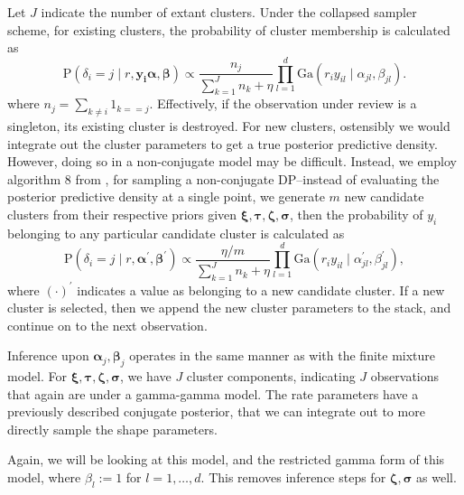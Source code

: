   Let $J$ indicate the number of extant clusters.  Under the collapsed sampler scheme, for existing
  clusters, the probability of cluster membership is calculated as
  \begin{equation}
    \label{eqn:dpdelta}
    \text{P}\left(\delta_i = j\mid r, \bm{ y_i} \bm{ \alpha}, \bm{ \beta}\right) \propto
        \frac{n_j}{\sum_{k = 1}^{J} n_k + \eta}
        {\textstyle\prod}_{l = 1}^d\text{Ga}\left(r_iy_{il}\mid\alpha_{jl},\beta_{jl}\right).
  \end{equation}
  where $n_j = {\textstyle\sum}_{k\neq i}1_{k == j}$.  Effectively, if the observation under review is a
  singleton, its existing cluster is destroyed.  For new clusters, ostensibly we would integrate out
  the cluster parameters to get a true posterior predictive density.  However, doing so in a
  non-conjugate model may be difficult.  Instead, we employ algorithm 8 from \cite{neal2000},
  for sampling a non-conjugate DP--instead of evaluating the posterior predictive density at a
  single point, we generate $m$ new candidate clusters from their respective priors given
  $\bm{ \xi,\tau,\zeta,\sigma}$, then the probability of $y_i$ belonging to any particular candidate
  cluster is calculated as
  \begin{equation}
    \label{eqn:dpdeltanew}
    \text{P}\left(\delta_i = j\mid r, \bm{ \alpha}^{\prime}, \bm{ \beta}^{\prime}\right) \propto
        \frac{\eta / m}{\sum_{k = 1}^{J} n_k + \eta}
        {\textstyle\prod}_{l = 1}^d\text{Ga}\left(r_iy_{il}\mid\alpha_{jl}^{\prime},\beta_{jl}^{\prime}\right),
  \end{equation}
  where $(\cdot)^{\prime}$ indicates a value as belonging to a new candidate cluster.  If a new cluster
  is selected, then we append the new cluster parameters to the stack, and continue on to the next
  observation.

Inference upon $\bm{ \alpha}_j,\bm{ \beta}_j$ operates in the same manner as with the finite mixture
  model.  For $\bm{ \xi,\tau,\zeta,\sigma}$, we have $J$ cluster components, indicating $J$
  observations that again are under a gamma-gamma model.  The rate parameters have a previously
  described conjugate posterior, that we can integrate out to more directly sample the shape
  parameters.

Again, we will be looking at this model, and the restricted gamma form of this model, where
  $\beta_l := 1$ for $l = 1,\ldots,d$.  This removes inference steps for $\bm{ \zeta},\bm{ \sigma}$
  as well.

